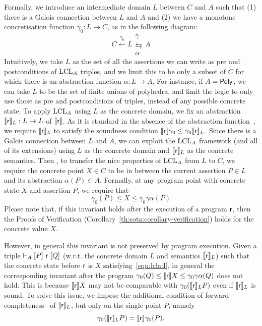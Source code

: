 Formally, we introduce an intermediate domain $L$ between $C$ and $A$ such that (1) there is a Galois connection between $L$ and $A$ and (2) we have a monotone concretisation function $\gamma_0 : L \rightarrow C$, as in the following diagram:
\[
C \xleftarrow{\gamma_0} L \mathrel{\substack{\gamma \\ \leftrightarrows \\ \alpha}} A
\]
Intuitively, we take $L$ as the set of all the assertions we can write as pre and postconditions of $\text{LCL}_A$ triples, and we limit this to be only a subset of $C$ for which there is an abstraction function $\alpha : L \rightarrow A$. For instance, if $A = \mathsf{Poly}$, we can take $L$ to be the set of finite unions of polyhedra, and limit the logic to only use those as pre and postconditions of triples, instead of any possible concrete state.
To apply $\text{LCL}_A$ using $L$ as the concrete domain, we fix an abstraction $\llbracket\mathsf{r}\rrbracket_L : L \rightarrow L$ of $\llbracket\mathsf{r}\rrbracket$. As it is standard in the absence of the abstraction function~\cite{CC92}, we require $\llbracket\mathsf{r}\rrbracket_L$ to satisfy the soundness condition $\llbracket\mathsf{r}\rrbracket \gamma_0 \le \gamma_0 \llbracket\mathsf{r}\rrbracket_L$.
Since there is a Galois connection between $L$ and $A$, we can exploit the $\text{LCL}_A$ framework (and all of its extensions) using $L$ as the concrete domain and $\llbracket\mathsf{r}\rrbracket_L$ as the concrete semantics. Then , to transfer the nice properties of $\text{LCL}_A$ from $L$ to $C$, we require the concrete point $X \in C$ to be in between the current assertion $P \in L$ and its abstraction $\alpha(P) \in A$. Formally, at any program point with concrete state $X$ and assertion $P$, we require that
\begin{equation*}\label{eqn:lcla:I}
	\gamma_0(P) \le X \le \gamma_0\gamma\alpha(P) \tag{I}
\end{equation*}
Please note that, if this invariant holds after the execution of a program $\mathsf{r}$, then the Proofs of Verification (Corollary~\ref{th:sota:corollary-verification}) holds for the concrete value $X$.

However, in general this invariant is not preserved by program execution. Given a triple $\vdash_{A}\nobreak[P]~\mathsf{r}~[Q]$ (w.r.t. the concrete domain $L$ and semantics $\llbracket\mathsf{r}\rrbracket_L$) such that the concrete state before $\mathsf{r}$ is $X$ satisfying~\eqref{eqn:lcla:I}, in general the corresponding invariant after the program $\gamma_0(Q) \le \llbracket\mathsf{r}\rrbracket X \le \gamma_0\gamma\alpha(Q)$ does not hold. This is because $\llbracket\mathsf{r}\rrbracket X$ may not be comparable with $\gamma_0 (\llbracket\mathsf{r}\rrbracket_L P)$ even if $\llbracket\mathsf{r}\rrbracket_L$ is sound. To solve this issue, we impose the additional condition of forward completeness~\cite{GQ01} of $\llbracket\mathsf{r}\rrbracket_L$, but only on the single point $P$, namely
\[
\gamma_0(\llbracket\mathsf{r}\rrbracket_L P) = \llbracket\mathsf{r}\rrbracket \gamma_0(P) .
\]

